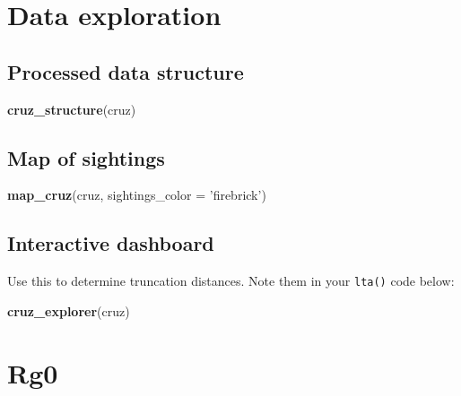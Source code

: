 \documentclass[
]{book}
\newenvironment{Shaded}{\begin{snugshade}}{\end{snugshade}}
\newcommand{\DataTypeTok}[1]{\textcolor[rgb]{0.13,0.29,0.53}{#1}}
\newcommand{\KeywordTok}[1]{\textcolor[rgb]{0.13,0.29,0.53}{\textbf{#1}}}
\newcommand{\NormalTok}[1]{#1}
\newcommand{\StringTok}[1]{\textcolor[rgb]{0.31,0.60,0.02}{#1}}
\begin{document}
\hypertarget{data-exploration-1}{%
\section*{Data exploration}\label{data-exploration-1}}

\hypertarget{processed-data-structure-1}{%
\subsection*{Processed data structure}\label{processed-data-structure-1}}

\begin{Shaded}
\begin{Highlighting}[]
\KeywordTok{cruz_structure}\NormalTok{(cruz)}
\end{Highlighting}
\end{Shaded}

\hypertarget{map-of-sightings-1}{%
\subsection*{Map of sightings}\label{map-of-sightings-1}}

\begin{Shaded}
\begin{Highlighting}[]
\KeywordTok{map_cruz}\NormalTok{(cruz, }\DataTypeTok{sightings_color =} \StringTok{'firebrick'}\NormalTok{)}
\end{Highlighting}
\end{Shaded}

\hypertarget{interactive-dashboard-2}{%
\subsection*{Interactive dashboard}\label{interactive-dashboard-2}}

Use this to determine truncation distances. Note them in your \texttt{lta()} code below:

\begin{Shaded}
\begin{Highlighting}[]
\KeywordTok{cruz_explorer}\NormalTok{(cruz)}
\end{Highlighting}
\end{Shaded}

\hypertarget{rg0-2}{%
\section*{Rg0}\label{rg0-2}}
\end{document}
